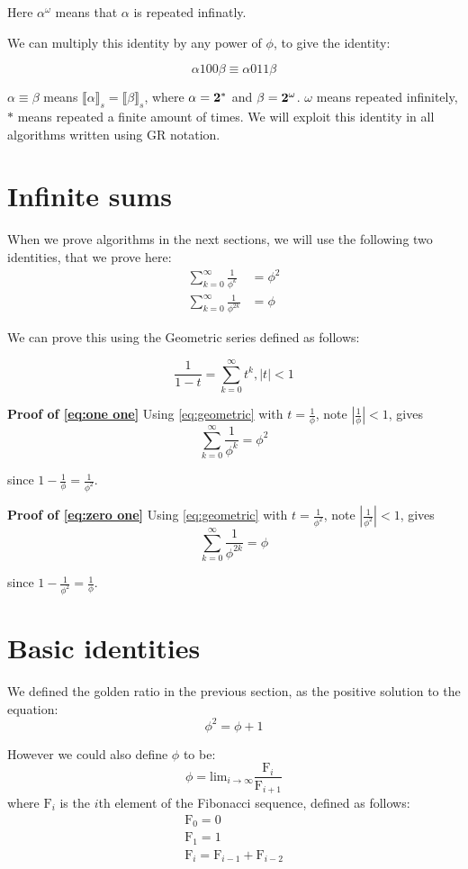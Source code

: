 \documentclass{cs4rep}
\begin{document}
Here $\alpha^{\omega}$ means that $\alpha$ is repeated infinatly.

We can multiply this identity by any power of $\phi$, to give the
identity:

\[ \alpha 100 \beta \equiv \alpha 011 \beta  \]

$\alpha \equiv \beta$ means $ \llbracket \alpha \rrbracket_{s} =
\llbracket \beta \rrbracket_{s} $, where $\alpha = {\bf 2}^{*}$ and
$\beta = {\bf 2}^{\omega}$.
$\omega$ means repeated infinitely, $*$ means repeated a finite amount
of times.  We will exploit this identity in all algorithms written
using GR notation.


\section{Infinite sums}
When we prove algorithms in the next sections, we will use  the following two identities, that we prove here:
\begin{eqnarray}
\sum^{\infty}_{k=0} \frac{1}{\phi^{k}} & = \phi^{2} \label{eq:one one}\\
\sum^{\infty}_{k=0} \frac{1}{\phi^{2k}} & = \phi \label{eq:zero one}
\end{eqnarray}

We can prove this using the Geometric series defined as follows:

\begin{equation} \label{eq:geometric}
\frac{1}{1-t} = \sum_{k=0}^{\infty} t^{k}, |t|<1
\end{equation}

{\bf Proof of \ref{eq:one one}}
Using \ref{eq:geometric} with $t=\frac{1}{\phi}$, note $|\frac{1}{\phi}|<1$, gives 
\[\sum^{\infty}_{k=0} \frac{1}{\phi^{k}} = \phi^{2} \]

since $1-\frac{1}{\phi} = \frac{1}{\phi^{2}}$.

{\bf Proof of \ref{eq:zero one}}
Using \ref{eq:geometric} with $t=\frac{1}{\phi^{2}}$, note $|\frac{1}{\phi^{2}}|<1$, gives 
\[\sum^{\infty}_{k=0} \frac{1}{\phi^{2k}} = \phi \]

since $1-\frac{1}{\phi^{2}} = \frac{1}{\phi}$.


\section{Basic identities}
We defined the golden ratio in the previous section, as the positive
solution to the equation:
\[ \phi^{2} = \phi +1 \]

However we could also define $\phi$ to be:
\[ \phi = \mbox{lim}_{i \rightarrow \infty} \frac{\mbox{F}_{i}}{\mbox{F}_{i+1}} \]
where $\mbox{F}_{i}$ is the $i$th element of the Fibonacci sequence,
defined as follows:
\[ \begin{array}{l}
\mbox{F}_{0} = 0 \\
\mbox{F}_{1} = 1 \\
\mbox{F}_{i} = \mbox{F}_{i-1} + \mbox{F}_{i-2}
\end{array} \]
\end{document}

